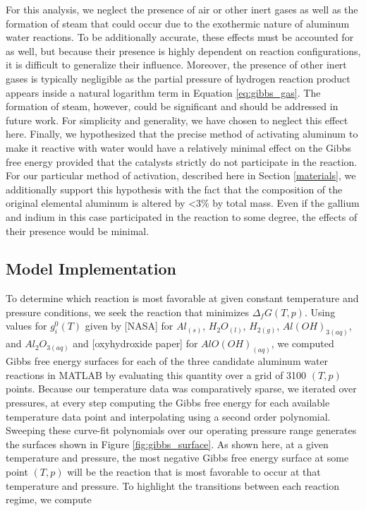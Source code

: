 \documentclass[preprint,12pt,3p]{elsarticle}
\begin{document}
For this analysis, we neglect the presence of air or other inert gases as well
as the formation of steam that could occur due to the exothermic nature of
aluminum water reactions. To be additionally accurate, these effects must be
accounted for as well, but because their presence is highly dependent on
reaction configurations, it is difficult to generalize their influence.
Moreover, the presence of other inert gases is typically negligible as the
partial pressure of hydrogen reaction product appears inside a natural logarithm
term in Equation \ref{eq:gibbs_gas}. The formation of steam, however, could be
significant and should be addressed in future work. For simplicity and
generality, we have chosen to neglect this effect here. Finally, we hypothesized
that the precise method of activating aluminum to make it reactive with water
would have a relatively minimal effect on the Gibbs free energy provided that
the catalysts strictly do not participate in the reaction. For our particular
method of activation, described here in Section \ref{materials}, we additionally
support this hypothesis with the fact that the composition of the original
elemental aluminum is altered by \textless3\% by total mass. Even if the gallium
and indium in this case participated in the reaction to some degree, the effects
of their presence would be minimal.

\subsection{Model Implementation}

To determine which reaction is most favorable at given constant temperature and
pressure conditions, we seek the reaction that minimizes $\Delta_f G(T,p)$.
Using values for $g_i^0(T)$ given by [NASA] for $Al_{(s)}$, $H_2O_{(l)}$,
$H_{2(g)}$, $Al(OH)_{3(aq)}$, and $Al_2O_{3(aq)}$ and [oxyhydroxide paper] for
$AlO(OH)_{(aq)}$, we computed Gibbs free energy surfaces for each of the three
candidate aluminum water reactions in MATLAB by evaluating this quantity over a
grid of 3100 $(T,p)$ points. Because our temperature data was comparatively
sparse, we iterated over pressures, at every step computing the Gibbs free
energy for each available temperature data point and interpolating using a
second order polynomial. Sweeping these curve-fit polynomials over our operating
pressure range generates the surfaces shown in Figure \ref{fig:gibbs_surface}.
As shown here, at a given temperature and pressure, the most negative Gibbs free
energy surface at some point $(T,p)$ will be the reaction that is most favorable
to occur at that temperature and pressure. To highlight the transitions between
each reaction regime, we compute
\end{document}
